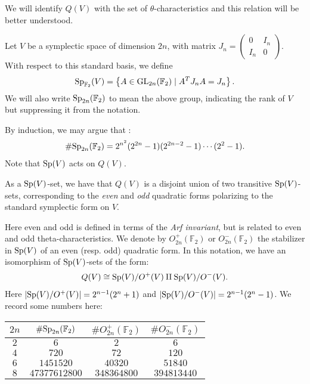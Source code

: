 \documentclass[11pt]{amsart}
\begin{document}
We will identify $Q(V)$ with the set of $\theta$-characteristics and this relation will be better understood.

\begin{notation} Let $V$ be a symplectic space of dimension $2n$, with matrix $J_n = \begin{pmatrix} 0 & I_n \\ I_n & 0 \end{pmatrix}$. With respect to this standard basis, we define
\begin{align*}
    \mathrm{Sp}_{\mathbb{F}_2}(V) = \left\{ A\in \mathrm{GL}_{2n}(\mathbb{F}_2) \mid A^T J_n A = J_n \right\}.
\end{align*}
We will also write $\mathrm{Sp}_{2n}(\mathbb{F}_2)$ to mean the above group, indicating the rank of $V$ but suppressing it from the notation.
\end{notation}
By induction, we may argue that \cite[5.9]{Dolgachev}:
\begin{align*}
    \# \mathrm{Sp}_{2n}(\mathbb{F}_2) = 2^{n^2}(2^{2n} -1)(2^{2n-2}-1) \cdots (2^2-1).
\end{align*}
%
Note that $\mathrm{Sp}(V)$ acts on $Q(V)$.

\begin{proposition} As a $\mathrm{Sp}(V)$-set, we have that $Q(V)$ is a disjoint union of two transitive $\mathrm{Sp}(V)$-sets, corresponding to the \emph{even} and \emph{odd} quadratic forms polarizing to the standard symplectic form on $V$.
\end{proposition}

Here even and odd is defined in terms of the \textit{Arf invariant}, but is related to even and odd theta-characteristics. We denote by $O_{2n}^+(\mathbb{F}_2)$ or $O_{2n}^-(\mathbb{F}_2)$ the stabilizer in $\mathrm{Sp}(V)$ of an even (resp. odd) quadratic form. In this notation, we have an isomorphism of $\mathrm{Sp}(V)$-sets of the form:
\begin{align*}
    Q(V) \cong \mathrm{Sp}(V)/O^+(V) \amalg \mathrm{Sp}(V) / O^-(V).
\end{align*}
%
Here $\left| \mathrm{Sp}(V)/O^+(V) \right| = 2^{n-1}(2^n+1)$ and $\left| \mathrm{Sp}(V)/O^-(V) \right| = 2^{n-1}(2^n-1)$. We record some numbers here:
\begin{center}
    \begin{tabular}{c | c c c}
    $2n$ & $\#\mathrm{Sp}_{2n}(\mathbb{F}_2)$ & $\#O_{2n}^+(\mathbb{F}_2)$ & $\# O_{2n}^-(\mathbb{F}_2)$\\
    \hline
    $2$ & $6$ & $2$ & $6$ \\
    $4$ & $720$ & $72$ & $120$ \\
    $6$ & $1451520$ & $40320$ & $51840$ \\
    $8$ & $47377612800$ & $348364800$ & $394813440$
    \end{tabular}
\end{center}
\end{document}
